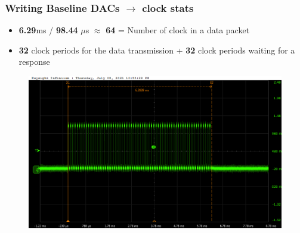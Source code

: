 \documentclass[aspectratio=169]{beamer}
\begin{document}
	\begin{frame}
	\frametitle{Writing Baseline DACs $\rightarrow$ clock stats}
	\begin{itemize}
		\item \textbf{6.29}ms / \textbf{98.44}  $\mu$s $\approx$ \textbf{64} = Number of clock in a data packet
		\item \textbf{32} clock periods for the data transmission + \textbf{32} clock periods waiting for a response
		
	\end{itemize}
	\begin{center}
		\begin{figure}
			\includegraphics[width=0.65 \textwidth]{IMG/probe/09-08-2021_packet-time.png}
		\end{figure}	
	\end{center}
	\end{frame}
\end{document}
